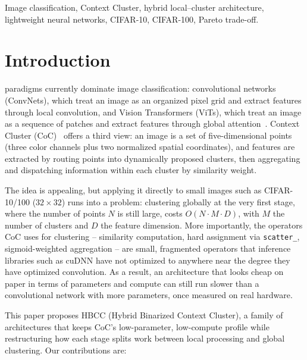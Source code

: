 \documentclass[journal]{IEEEtran}
\begin{document}
\begin{IEEEkeywords}
Image classification, Context Cluster, hybrid local--cluster architecture, lightweight neural networks, CIFAR-10, CIFAR-100, Pareto trade-off.
\end{IEEEkeywords}

\section{Introduction}

 paradigms currently dominate image classification: convolutional networks (ConvNets), which treat an image as an organized pixel grid and extract features through local convolution, and Vision Transformers (ViTs), which treat an image as a sequence of patches and extract features through global attention~\cite{Dosovitskiy2021ViT}. Context Cluster (CoC)~\cite{Ma2023ImageAsSetOfPoints} offers a third view: an image is a set of five-dimensional points (three color channels plus two normalized spatial coordinates), and features are extracted by routing points into dynamically proposed clusters, then aggregating and dispatching information within each cluster by similarity weight.

The idea is appealing, but applying it directly to small images such as CIFAR-10/100 ($32\times32$) runs into a problem: clustering globally at the very first stage, where the number of points $N$ is still large, costs $O(N \cdot M \cdot D)$, with $M$ the number of clusters and $D$ the feature dimension. More importantly, the operators CoC uses for clustering -- similarity computation, hard assignment via \texttt{scatter\_}, sigmoid-weighted aggregation -- are small, fragmented operators that inference libraries such as cuDNN have not optimized to anywhere near the degree they have optimized convolution. As a result, an architecture that looks cheap on paper in terms of parameters and compute can still run slower than a convolutional network with more parameters, once measured on real hardware.

This paper proposes HBCC (Hybrid Binarized Context Cluster), a family of architectures that keeps CoC's low-parameter, low-compute profile while restructuring how each stage splits work between local processing and global clustering. Our contributions are:
\end{document}
